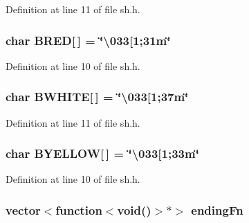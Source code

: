 Definition at line 11 of file sh.\+h.

\subsubsection[{\texorpdfstring{B\+R\+ED}{BRED}}]{\setlength{\rightskip}{0pt plus 5cm}char B\+R\+ED\mbox{[}$\,$\mbox{]} = \char`\"{}\textbackslash{}033\mbox{[}1;31m\char`\"{}}\hypertarget{namespace_k_ae09107156acfd00c2e31f049f70b622a}{}\label{namespace_k_ae09107156acfd00c2e31f049f70b622a}


Definition at line 10 of file sh.\+h.

\subsubsection[{\texorpdfstring{B\+W\+H\+I\+TE}{BWHITE}}]{\setlength{\rightskip}{0pt plus 5cm}char B\+W\+H\+I\+TE\mbox{[}$\,$\mbox{]} = \char`\"{}\textbackslash{}033\mbox{[}1;37m\char`\"{}}\hypertarget{namespace_k_a723a80b3fad44765a8c6371fd4841609}{}\label{namespace_k_a723a80b3fad44765a8c6371fd4841609}


Definition at line 11 of file sh.\+h.

\subsubsection[{\texorpdfstring{B\+Y\+E\+L\+L\+OW}{BYELLOW}}]{\setlength{\rightskip}{0pt plus 5cm}char B\+Y\+E\+L\+L\+OW\mbox{[}$\,$\mbox{]} = \char`\"{}\textbackslash{}033\mbox{[}1;33m\char`\"{}}\hypertarget{namespace_k_aa522b04bcf50df65fd4819d0b46d6664}{}\label{namespace_k_aa522b04bcf50df65fd4819d0b46d6664}


Definition at line 10 of file sh.\+h.

\subsubsection[{\texorpdfstring{ending\+Fn}{endingFn}}]{\setlength{\rightskip}{0pt plus 5cm}vector$<$function$<$void()$>$$\ast$$>$ ending\+Fn}\hypertarget{namespace_k_a1c3ecbe3046298af183be61349de6900}{}\label{namespace_k_a1c3ecbe3046298af183be61349de6900}


